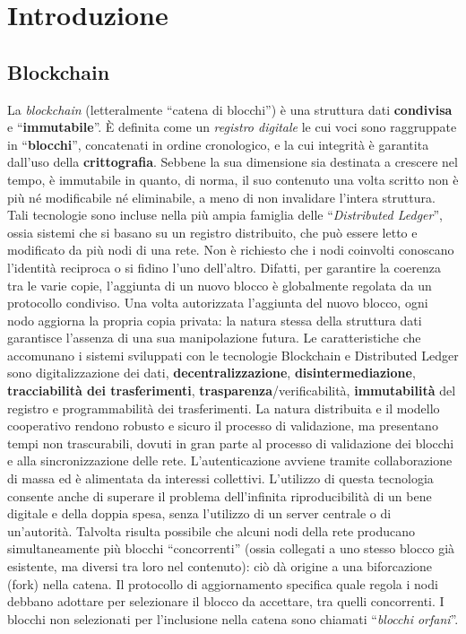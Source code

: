 \section{Introduzione}

\subsection{Blockchain}

La \textit{blockchain} (letteralmente ``catena di blocchi'') è una struttura dati
\textbf{condivisa} e ``\textbf{immutabile}''. È definita come un \textit{registro
    digitale} le cui voci sono raggruppate in ``\textbf{blocchi}'', concatenati in
ordine cronologico, e la cui integrità è garantita dall'uso della
\textbf{crittografia}. Sebbene la sua dimensione sia destinata a crescere nel
tempo, è immutabile in quanto, di norma, il suo contenuto una volta scritto non
è più né modificabile né eliminabile, a meno di non invalidare l'intera
struttura. Tali tecnologie sono incluse nella più ampia famiglia delle
``\textit{Distributed Ledger}'', ossia sistemi che si basano su un registro
distribuito, che può essere letto e modificato da più nodi di una rete. Non è
richiesto che i nodi coinvolti conoscano l'identità reciproca o si fidino l'uno
dell'altro. Difatti, per garantire la coerenza tra le varie copie, l'aggiunta di
un nuovo blocco è globalmente regolata da un protocollo condiviso. Una volta
autorizzata l'aggiunta del nuovo blocco, ogni nodo aggiorna la propria copia
privata: la natura stessa della struttura dati garantisce l'assenza di una sua
manipolazione futura. Le caratteristiche che accomunano i sistemi sviluppati con
le tecnologie Blockchain e Distributed Ledger sono digitalizzazione dei dati,
\textbf{decentralizzazione}, \textbf{disintermediazione}, \textbf{tracciabilità
    dei trasferimenti}, \textbf{trasparenza}/verificabilità, \textbf{immutabilità}
del registro e programmabilità dei trasferimenti. La natura distribuita e il
modello cooperativo rendono robusto e sicuro il processo di validazione, ma
presentano tempi non trascurabili, dovuti in gran parte al processo di
validazione dei blocchi e alla sincronizzazione delle rete. L'autenticazione
avviene tramite collaborazione di massa ed è alimentata da interessi collettivi.
L'utilizzo di questa tecnologia consente anche di superare il problema
dell'infinita riproducibilità di un bene digitale e della doppia spesa, senza
l'utilizzo di un server centrale o di un'autorità. Talvolta risulta possibile
che alcuni nodi della rete producano simultaneamente più blocchi ``concorrenti''
(ossia collegati a uno stesso blocco già esistente, ma diversi tra loro nel
contenuto): ciò dà origine a una biforcazione (fork) nella catena. Il protocollo
di aggiornamento specifica quale regola i nodi debbano adottare per selezionare
il blocco da accettare, tra quelli concorrenti. I blocchi non selezionati per
l'inclusione nella catena sono chiamati ``\textit{blocchi orfani}''.

